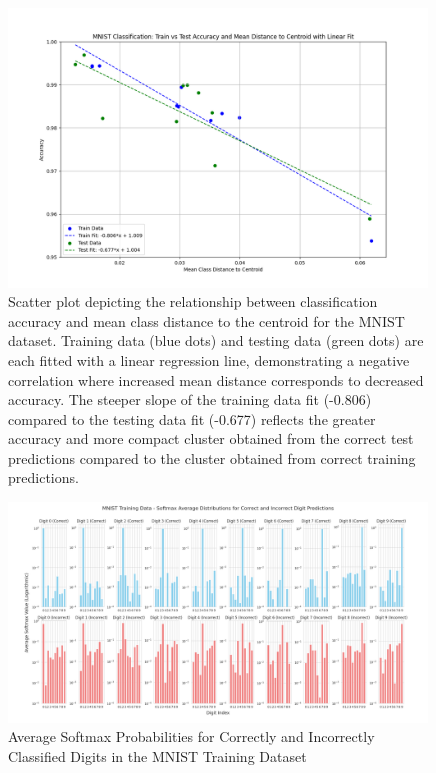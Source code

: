 \begin{figure}[h]
    \centering
    \includegraphics[width=0.99\textwidth]{Figures/Methods/MNIST_Classification_Train_Test_Accuracy_Mean_Distance_to_Centroid_Linear_Fit.png}
    \caption{Scatter plot depicting the relationship between classification accuracy and mean class distance to the centroid for the MNIST dataset. Training data (blue dots) and testing data (green dots) are each fitted with a linear regression line, demonstrating a negative correlation where increased mean distance corresponds to decreased accuracy. The steeper slope of the training data fit (-0.806) compared to the testing data fit (-0.677) reflects the greater accuracy and more compact cluster obtained from the correct test predictions compared to the cluster obtained from correct training predictions.}
    \label{fig:MNIST_Classification_Train_Test_Accuracy_Mean_Distance_to_Centroid_Linear_Fit}
\end{figure}


\begin{figure}[h]
    \centering
    \includegraphics[width=0.99\textwidth]{Figures/Methods/MNIST_Softmax_Averages_Training.png}
    \caption{Average Softmax Probabilities for Correctly and Incorrectly Classified Digits in the MNIST Training Dataset}
    \label{fig:MNIST_Softmax_Averages_Training}
\end{figure}

